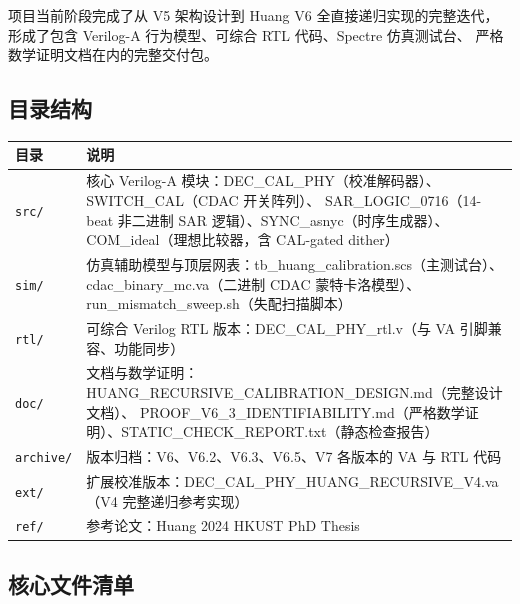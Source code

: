 \documentclass[UTF8,a4paper,12pt]{ctexart}
\theoremstyle{definition}
\begin{document}
项目当前阶段完成了从 V5 架构设计到 Huang V6 全直接递归实现的完整迭代，
形成了包含 Verilog-A 行为模型、可综合 RTL 代码、Spectre 仿真测试台、
严格数学证明文档在内的完整交付包。

\subsection{目录结构}

\begin{longtable}{p{3cm}p{10cm}}
\toprule
\textbf{目录} & \textbf{说明} \\
\midrule
\endhead
\bottomrule
\endfoot
\texttt{src/} & 核心 Verilog-A 模块：DEC\_CAL\_PHY（校准解码器）、SWITCH\_CAL（CDAC 开关阵列）、
SAR\_LOGIC\_0716（14-beat 非二进制 SAR 逻辑）、SYNC\_asnyc（时序生成器）、
COM\_ideal（理想比较器，含 CAL-gated dither） \\
\texttt{sim/} & 仿真辅助模型与顶层网表：tb\_huang\_calibration.scs（主测试台）、
cdac\_binary\_mc.va（二进制 CDAC 蒙特卡洛模型）、run\_mismatch\_sweep.sh（失配扫描脚本） \\
\texttt{rtl/} & 可综合 Verilog RTL 版本：DEC\_CAL\_PHY\_rtl.v（与 VA 引脚兼容、功能同步） \\
\texttt{doc/} & 文档与数学证明：HUANG\_RECURSIVE\_CALIBRATION\_DESIGN.md（完整设计文档）、
PROOF\_V6\_3\_IDENTIFIABILITY.md（严格数学证明）、STATIC\_CHECK\_REPORT.txt（静态检查报告） \\
\texttt{archive/} & 版本归档：V6、V6.2、V6.3、V6.5、V7 各版本的 VA 与 RTL 代码 \\
\texttt{ext/} & 扩展校准版本：DEC\_CAL\_PHY\_HUANG\_RECURSIVE\_V4.va（V4 完整递归参考实现） \\
\texttt{ref/} & 参考论文：Huang 2024 HKUST PhD Thesis \\
\bottomrule
\end{longtable}

\subsection{核心文件清单}
\end{document}
